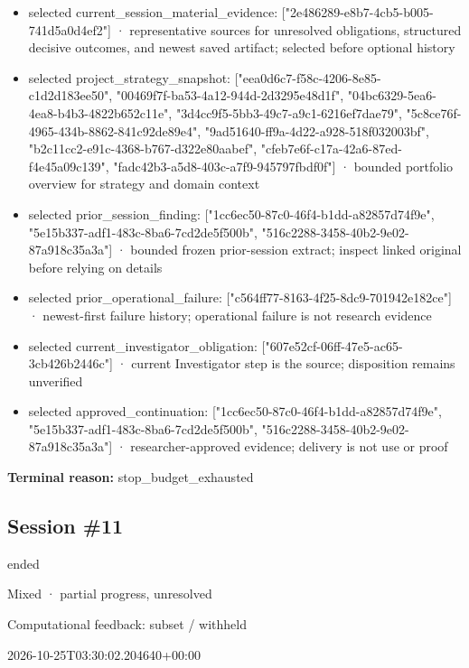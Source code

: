 \documentclass[11pt]{article}
\begin{document}
\begin{itemize}
\item selected current\_session\_material\_evidence: ["2e486289-e8b7-4cb5-b005-741d5a0d4ef2"] · representative sources for unresolved obligations, structured decisive outcomes, and newest saved artifact; selected before optional history
\item selected project\_strategy\_snapshot: ["eea0d6c7-f58c-4206-8e85-c1d2d183ee50", "00469f7f-ba53-4a12-944d-2d3295e48d1f", "04bc6329-5ea6-4ea8-b4b3-4822b652c11e", "3d4cc9f5-5bb3-49c7-a9c1-6216ef7dae79", "5c8ce76f-4965-434b-8862-841c92de89e4", "9ad51640-ff9a-4d22-a928-518f032003bf", "b2c11cc2-e91c-4368-b767-d322e80aabef", "cfeb7e6f-c17a-42a6-87ed-f4e45a09c139", "fadc42b3-a5d8-403c-a7f9-945797fbdf0f"] · bounded portfolio overview for strategy and domain context
\item selected prior\_session\_finding: ["1cc6ec50-87c0-46f4-b1dd-a82857d74f9e", "5e15b337-adf1-483c-8ba6-7cd2de5f500b", "516c2288-3458-40b2-9e02-87a918c35a3a"] · bounded frozen prior-session extract; inspect linked original before relying on details
\item selected prior\_operational\_failure: ["c564ff77-8163-4f25-8dc9-701942e182ce"] · newest-first failure history; operational failure is not research evidence
\item selected current\_investigator\_obligation: ["607e52cf-06ff-47e5-ac65-3cb426b2446c"] · current Investigator step is the source; disposition remains unverified
\item selected approved\_continuation: ["1cc6ec50-87c0-46f4-b1dd-a82857d74f9e", "5e15b337-adf1-483c-8ba6-7cd2de5f500b", "516c2288-3458-40b2-9e02-87a918c35a3a"] · researcher-approved evidence; delivery is not use or proof
\end{itemize}
\textbf{Terminal reason:} stop\_budget\_exhausted\par
\subsection{Session \#11}
\begin{description}[style=nextline,font=\normalfont\bfseries,leftmargin=0pt,labelsep=0pt]
\item[Execution status] ended
\item[Outcome] Mixed · partial progress, unresolved
\item[Strategy] Computational feedback: subset / withheld
\item[Started] 2026-10-25T03:30:02.204640+00:00
\end{description}
\end{document}
